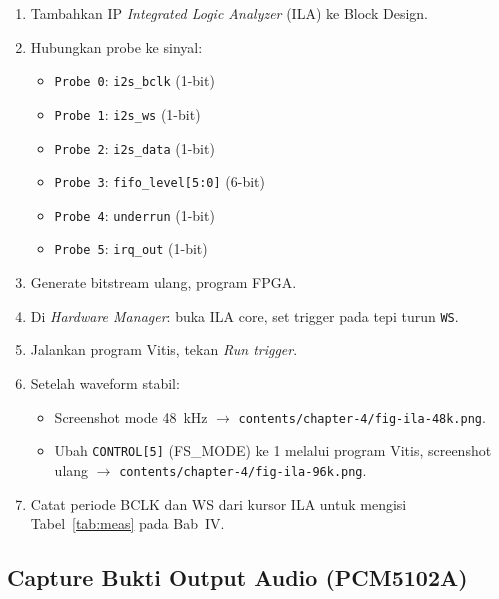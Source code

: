 \begin{enumerate}
  \item Tambahkan IP \textit{Integrated Logic Analyzer} (ILA) ke Block Design.
  \item Hubungkan probe ke sinyal:
    \begin{itemize}
      \item \texttt{Probe~0}: \texttt{i2s\_bclk} (1-bit)
      \item \texttt{Probe~1}: \texttt{i2s\_ws} (1-bit)
      \item \texttt{Probe~2}: \texttt{i2s\_data} (1-bit)
      \item \texttt{Probe~3}: \texttt{fifo\_level[5:0]} (6-bit)
      \item \texttt{Probe~4}: \texttt{underrun} (1-bit)
      \item \texttt{Probe~5}: \texttt{irq\_out} (1-bit)
    \end{itemize}
  \item Generate bitstream ulang, program FPGA.
  \item Di \textit{Hardware Manager}: buka ILA core, set trigger pada tepi turun \texttt{WS}.
  \item Jalankan program Vitis, tekan \textit{Run trigger}.
  \item Setelah waveform stabil:
    \begin{itemize}
      \item Screenshot mode 48~kHz $\rightarrow$ \texttt{contents/chapter-4/fig-ila-48k.png}.
      \item Ubah \texttt{CONTROL[5]} (FS\_MODE) ke 1 melalui program Vitis, screenshot ulang
            $\rightarrow$ \texttt{contents/chapter-4/fig-ila-96k.png}.
    \end{itemize}
  \item Catat periode BCLK dan WS dari kursor ILA untuk mengisi Tabel~\ref{tab:meas} pada Bab~IV.
\end{enumerate}

\subsection{Capture Bukti Output Audio (PCM5102A)}

